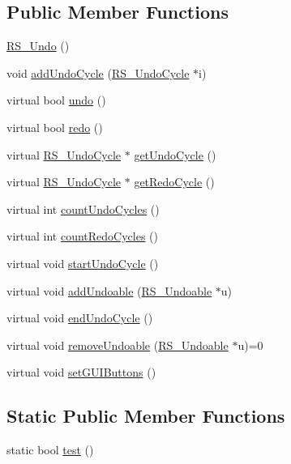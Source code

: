 \subsection*{Public Member Functions}
\begin{DoxyCompactItemize}
\item 
\hyperlink{classRS__Undo_a799f14114717bdaa94cbafb7e1b36c29}{R\-S\-\_\-\-Undo} ()
\item 
void \hyperlink{classRS__Undo_a734f94ee8180caea3c1a31200e2e2473}{add\-Undo\-Cycle} (\hyperlink{classRS__UndoCycle}{R\-S\-\_\-\-Undo\-Cycle} $\ast$i)
\item 
virtual bool \hyperlink{classRS__Undo_adbe3c82cedfdf11edbef14d43a2666bd}{undo} ()
\item 
virtual bool \hyperlink{classRS__Undo_af6851ac0b268e0542ba952db60453b46}{redo} ()
\item 
virtual \hyperlink{classRS__UndoCycle}{R\-S\-\_\-\-Undo\-Cycle} $\ast$ \hyperlink{classRS__Undo_a20d9fb1a8598aa67a46ab4ec5f2f73e2}{get\-Undo\-Cycle} ()
\item 
virtual \hyperlink{classRS__UndoCycle}{R\-S\-\_\-\-Undo\-Cycle} $\ast$ \hyperlink{classRS__Undo_a095f2315d74e0bfd8a98e0523504c497}{get\-Redo\-Cycle} ()
\item 
virtual int \hyperlink{classRS__Undo_af7e643590c293acd4e602884585254fe}{count\-Undo\-Cycles} ()
\item 
virtual int \hyperlink{classRS__Undo_afbe439460b8db37026be55984bf065bd}{count\-Redo\-Cycles} ()
\item 
virtual void \hyperlink{classRS__Undo_ae5072794f8b500d8ac71ec778465d9d1}{start\-Undo\-Cycle} ()
\item 
virtual void \hyperlink{classRS__Undo_ad18cd07ef7366e30d3b4dcf71bed685e}{add\-Undoable} (\hyperlink{classRS__Undoable}{R\-S\-\_\-\-Undoable} $\ast$u)
\item 
virtual void \hyperlink{classRS__Undo_a38779a6cf414880d30adcb401f39ccb1}{end\-Undo\-Cycle} ()
\item 
virtual void \hyperlink{classRS__Undo_af6e7ff4fb277e2d6635200f0563310ef}{remove\-Undoable} (\hyperlink{classRS__Undoable}{R\-S\-\_\-\-Undoable} $\ast$u)=0
\item 
virtual void \hyperlink{classRS__Undo_ac0141af319c4ed8011b6e4ca3f23b2f0}{set\-G\-U\-I\-Buttons} ()
\end{DoxyCompactItemize}
\subsection*{Static Public Member Functions}
\begin{DoxyCompactItemize}
\item 
static bool \hyperlink{classRS__Undo_a037a55ea2a64516543c166a35624a930}{test} ()
\end{DoxyCompactItemize}
